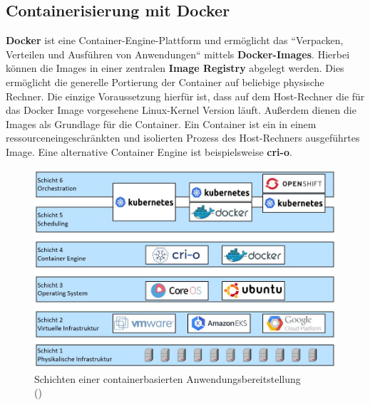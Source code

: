 \subsection{Containerisierung mit Docker}
\textbf{Docker} ist eine Container-Engine-Plattform und ermöglicht das ``Verpacken, Verteilen und Ausführen von Anwendungen`` \autocite[][S. 15]{Luksa.2018} mittels \textbf{Docker-Images}. Hierbei können die Images in einer zentralen \textbf{Image Registry} abgelegt werden. Dies ermöglicht die generelle Portierung der Container auf beliebige physische Rechner. Die einzige Voraussetzung hierfür ist, dass auf dem Host-Rechner die für das Docker Image vorgesehene Linux-Kernel Version läuft. Außerdem dienen die Images als Grundlage für die Container. Ein Container ist ein in einem ressourceneingeschränkten und isolierten Prozess des Host-Rechners ausgeführtes Image. \autocite[Vgl.][S. 14-15, 18]{Luksa.2018} Eine alternative Container Engine ist beispielsweise \textbf{cri-o}.\autocite[Vgl.][S. 79]{Liebel.2019}%
\\
\begin{figure}[h]
	\begin{center}
		\includegraphics[width=14cm]{img/Container_Schichten_Architektur.JPG}
		\caption[Schichten einer containerbasierten Anwendungsbereitstellung]{Schichten einer containerbasierten Anwendungsbereitstellung\\
			(\cite[Eigene Abbildung in Anlehnung an][S.79]{Liebel.2019})}
		\label{Container_Schichten_Architektur}
	\end{center}
\end{figure}
\newpage
